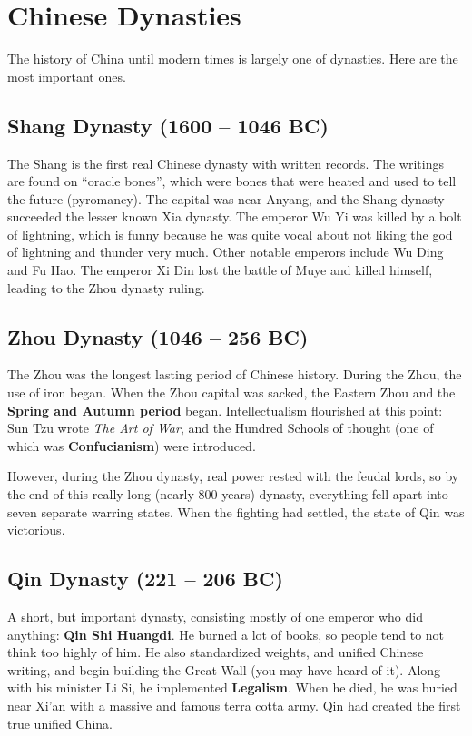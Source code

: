 \section{Chinese Dynasties}

The history of China until modern times is largely one of dynasties.
Here are the most important ones.

\subsection*{Shang Dynasty (1600 -- 1046 BC)}

The Shang is the first real Chinese dynasty with written records.
The writings are found on ``oracle bones'',
which were bones that were heated and used to tell the future (pyromancy).
The capital was near Anyang, and the Shang dynasty succeeded the lesser known Xia dynasty.
The emperor Wu Yi was killed by a bolt of lightning,
which is funny because he was quite vocal about not liking the god of lightning and thunder very much.
Other notable emperors include Wu Ding and Fu Hao.
The emperor Xi Din lost the battle of Muye and killed himself,
leading to the Zhou dynasty ruling.

\subsection*{Zhou Dynasty (1046 -- 256 BC)}

The Zhou was the longest lasting period of Chinese history.
During the Zhou, the use of iron began.
When the Zhou capital was sacked, the Eastern Zhou and the \textbf{Spring and Autumn period} began.
Intellectualism flourished at this point:
Sun Tzu wrote \textit{The Art of War},
and the Hundred Schools of thought (one of which was \textbf{Confucianism}) were introduced.

However, during the Zhou dynasty, real power rested with the feudal lords, so
by the end of this really long (nearly 800 years) dynasty,
everything fell apart into seven separate warring states.
When the fighting had settled, the state of Qin was victorious.

\subsection*{Qin Dynasty (221 -- 206 BC)}

A short, but important dynasty, consisting mostly of one emperor who did anything: \textbf{Qin Shi Huangdi}.
He burned a lot of books, so people tend to not think too highly of him.
He also standardized weights, and unified Chinese writing,
and begin building the Great Wall (you may have heard of it).
Along with his minister Li Si, he implemented \textbf{Legalism}.
When he died, he was buried near Xi'an with a massive and famous terra cotta army.
Qin had created the first true unified China.

